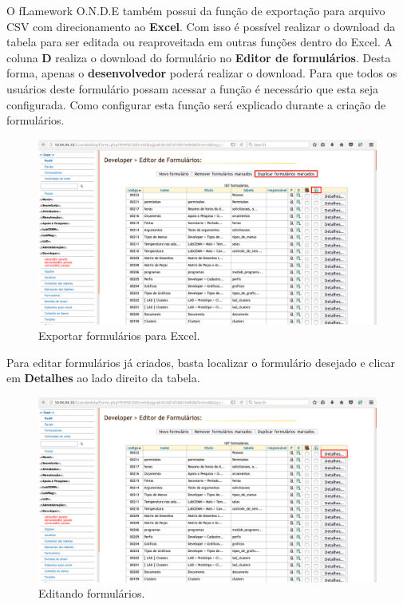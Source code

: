 \documentclass[9pt]{report}
\begin{document}
{    O fLamework O.N.D.E também possui da função de exportação para
    arquivo CSV com direcionamento ao \textbf{Excel}. Com isso é
    possível realizar o download da tabela para ser editada ou
    reaproveitada em outras funções dentro do Excel. A coluna
    \textbf{D} realiza o download do formulário no
    \textbf{Editor de formulários}. Desta forma, apenas o
    \textbf{desenvolvedor} poderá realizar o download. Para que todos
    os usuários deste formulário possam acessar a função é necessário
    que esta seja configurada. Como configurar esta função será
    explicado durante a criação de formulários.

     \begin{figure}[H]
      \includegraphics[width=\textwidth]{2_Formularios/1_Editor_de_formularios/7.png}
      \caption{Exportar formulários para Excel.}
      \label{fig:exportExcel}
     \end{figure}

     Para editar formulários já criados, basta localizar o formulário
     desejado e clicar em \textbf{Detalhes} ao lado direito da tabela.

     \begin{figure}[H]
      \includegraphics[width=\textwidth]{2_Formularios/1_Editor_de_formularios/8.png}
      \caption{Editando formulários.}
      \label{fig:detalhesForms}
     \end{figure}
        
}
\end{document}
